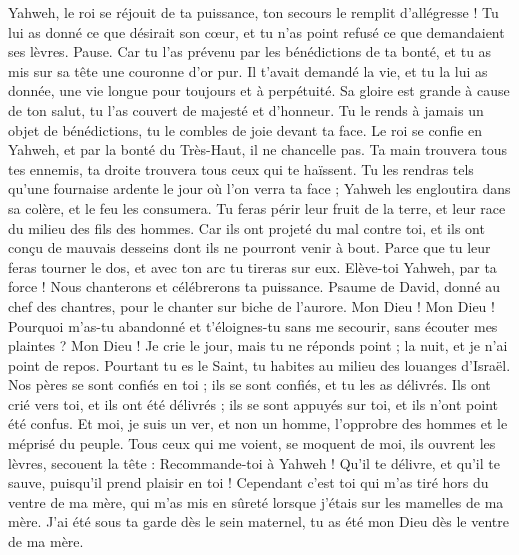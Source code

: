 \begin{multicols}{2}
Yahweh, le roi se réjouit de ta puissance, ton secours le remplit d’allégresse !
Tu lui as donné ce que désirait son cœur, et tu n’as point refusé ce que demandaient ses lèvres. Pause.
Car tu l'as prévenu par les bénédictions de ta bonté, et tu as mis sur sa tête une couronne d’or pur.
Il t'avait demandé la vie, et tu la lui as donnée, une vie longue pour toujours et à perpétuité.
Sa gloire est grande à cause de ton salut, tu l'as couvert de majesté et d'honneur.
Tu le rends à jamais un objet de bénédictions, tu le combles de joie devant ta face.
Le roi se confie en Yahweh, et par la bonté du Très-Haut, il ne chancelle pas.
Ta main trouvera tous tes ennemis, ta droite trouvera tous ceux qui te haïssent.
Tu les rendras tels qu’une fournaise ardente le jour où l’on verra ta face ; Yahweh les engloutira dans sa colère, et le feu les consumera.
Tu feras périr leur fruit de la terre, et leur race du milieu des fils des hommes.
Car ils ont projeté du mal contre toi, et ils ont conçu de mauvais desseins dont ils ne pourront venir à bout.
Parce que tu leur feras tourner le dos, et avec ton arc tu tireras sur eux.
Elève-toi Yahweh, par ta force ! Nous chanterons et célébrerons ta puissance.
\VerseOne{}Psaume de David, donné au chef des chantres, pour le chanter sur biche de l’aurore.
Mon Dieu ! Mon Dieu ! Pourquoi m'as-tu abandonné et t’éloignes-tu sans me secourir, sans écouter mes plaintes ?
Mon Dieu ! Je crie le jour, mais tu ne réponds point ; la nuit, et je n’ai point de repos.
Pourtant tu es le Saint, tu habites au milieu des louanges d'Israël.
Nos pères se sont confiés en toi ; ils se sont confiés, et tu les as délivrés.
Ils ont crié vers toi, et ils ont été délivrés ; ils se sont appuyés sur toi, et ils n'ont point été confus.
Et moi, je suis un ver, et non un homme, l'opprobre des hommes et le méprisé du peuple.
Tous ceux qui me voient, se moquent de moi, ils ouvrent les lèvres, secouent la tête :
Recommande-toi à Yahweh ! Qu'il te délivre, et qu'il te sauve, puisqu'il prend plaisir en toi !
Cependant c'est toi qui m'as tiré hors du ventre de ma mère, qui m'as mis en sûreté lorsque j'étais sur les mamelles de ma mère.
J'ai été sous ta garde dès le sein maternel, tu as été mon Dieu dès le ventre de ma mère.

\end{multicols}
